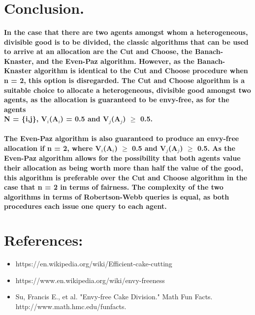 \documentclass[12pt]{report}
\begin{document}
\section{Conclusion.}
	\paragraph{In the case that there are two agents amongst whom a heterogeneous, divisible good is to be divided, the classic algorithms that can be used to arrive at an allocation are the Cut and Choose, the Banach-Knaster, and the Even-Paz algorithm. However, as the Banach-Knaster algorithm is identical to the Cut and Choose procedure when n = 2, this option is disregarded. The Cut and	Choose algorithm is a suitable choice to allocate a heterogeneous, divisible good amongst two agents, as the allocation is guaranteed to be envy-free, as for the agents \\
		N = \{i,j\}, V$_{i}$(A$_{i}$) = 0.5 and V$_{j}$(A$_{j}$) $\geq$ 0.5.}
\paragraph{The Even-Paz algorithm is also guaranteed to produce an envy-free allocation if n = 2, where V$_{i}$(A$_{i}$) $\geq$ 0.5 and V$_{j}$(A$_{j}$) $\geq$ 0.5. As the Even-Paz algorithm allows for the possibility that both	agents value their allocation as being worth more than half the value of the	good, this algorithm is preferable over the Cut and Choose algorithm in the case that n = 2 in terms of fairness. The complexity of the two algorithms in terms of Robertson-Webb queries is equal, as both procedures each issue one query to each agent.}
	\section{References:}
	\begin{itemize}
		
	    \item {https://en.wikipedia.org/wiki/Efficient-cake-cutting}
		\item {https://www.en.wikipedia.org/wiki/envy-freeness}
		\item {Su, Francis E., et al. "Envy-free Cake Division." Math Fun Facts. http://www.math.hmc.edu/funfacts.}

	\end{itemize}
	
	
	
\end{document}
